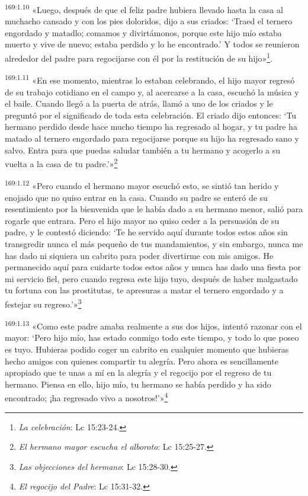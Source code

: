 \par 
\textsuperscript{169:1.10} «Luego, después de que el feliz padre hubiera llevado hasta la casa al muchacho cansado y con los pies doloridos, dijo a sus criados: `Traed el ternero engordado y matadlo; comamos y divirtámonos, porque este hijo mío estaba muerto y vive de nuevo; estaba perdido y lo he encontrado.' Y todos se reunieron alrededor del padre para regocijarse con él por la restitución de su hijo»\footnote{\textit{La celebración}: Lc 15:23-24.}.

\par 
\textsuperscript{169:1.11} «En ese momento, mientras lo estaban celebrando, el hijo mayor regresó de su trabajo cotidiano en el campo y, al acercarse a la casa, escuchó la música y el baile. Cuando llegó a la puerta de atrás, llamó a uno de los criados y le preguntó por el significado de toda esta celebración. El criado dijo entonces: `Tu hermano perdido desde hace mucho tiempo ha regresado al hogar, y tu padre ha matado al ternero engordado para regocijarse porque su hijo ha regresado sano y salvo. Entra para que puedas saludar también a tu hermano y acogerlo a su vuelta a la casa de tu padre.'»\footnote{\textit{El hermano mayor escucha el alboroto}: Lc 15:25-27.}

\par 
\textsuperscript{169:1.12} «Pero cuando el hermano mayor escuchó esto, se sintió tan herido y enojado que no quiso entrar en la casa. Cuando su padre se enteró de su resentimiento por la bienvenida que le había dado a su hermano menor, salió para rogarle que entrara. Pero el hijo mayor no quiso ceder a la persuasión de su padre, y le contestó diciendo: `Te he servido aquí durante todos estos años sin transgredir nunca el más pequeño de tus mandamientos, y sin embargo, nunca me has dado ni siquiera un cabrito para poder divertirme con mis amigos. He permanecido aquí para cuidarte todos estos años y nunca has dado una fiesta por mi servicio fiel, pero cuando regresa este hijo tuyo, después de haber malgastado tu fortuna con las prostitutas, te apresuras a matar el ternero engordado y a festejar su regreso.'»\footnote{\textit{Las objecciones del hermano}: Lc 15:28-30.}

\par 
\textsuperscript{169:1.13} «Como este padre amaba realmente a sus dos hijos, intentó razonar con el mayor: `Pero hijo mío, has estado conmigo todo este tiempo, y todo lo que poseo es tuyo. Hubieras podido coger un cabrito en cualquier momento que hubieras hecho amigos con quienes compartir tu alegría. Pero ahora es sencillamente apropiado que te unas a mí en la alegría y el regocijo por el regreso de tu hermano. Piensa en ello, hijo mío, tu hermano se había perdido y ha sido encontrado; ¡ha regresado vivo a nosotros!'»\footnote{\textit{El regocijo del Padre}: Lc 15:31-32.}


